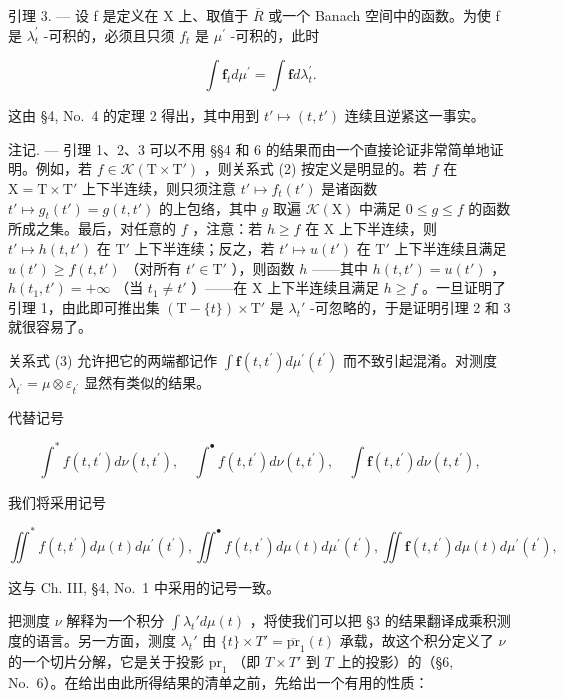 引理 3. --- 设 f 是定义在 X 上、取值于 \(\overline{R}\) 或一个 Banach 空间中的函数。为使 f 是 \(\lambda_{t}^{\prime}\) -可积的，必须且只须 \(f_{t}\) 是 \(\mu^{\prime}\) -可积的，此时

\[
\int \mathbf {f} _ {t} d \mu^ {\prime} = \int \mathbf {f} d \lambda_ {t} ^ {\prime}.\tag{3}
\]

这由 §4, No.~4 的定理 2 得出，其中用到 \(t' \mapsto (t, t')\) 连续且逆紧这一事实。

注记. --- 引理 1、2、3 可以不用 §§4 和 6 的结果而由一个直接论证非常简单地证明。例如，若 \(f \in \mathcal{K}(\mathrm{T} \times \mathrm{T}')\) ，则关系式 (2) 按定义是明显的。若 \(f\) 在 \(\mathrm{X} = \mathrm{T} \times \mathrm{T}'\) 上下半连续，则只须注意 \(t' \mapsto f_t(t')\) 是诸函数 \(t' \mapsto g_t(t') = g(t, t')\) 的上包络，其中 \(g\) 取遍 \(\mathcal{K}(\mathrm{X})\) 中满足 \(0 \leqslant g \leqslant f\) 的函数所成之集。最后，对任意的 \(f\) ，注意：若 \(h \geqslant f\) 在 \(\mathrm{X}\) 上下半连续，则 \(t' \mapsto h(t, t')\) 在 \(\mathrm{T}'\) 上下半连续；反之，若 \(t' \mapsto u(t')\) 在 \(\mathrm{T}'\) 上下半连续且满足 \(u(t') \geqslant f(t, t')\) （对所有 \(t' \in \mathrm{T}'\) ），则函数 \(h\) ——其中 \(h(t, t') = u(t')\) ，\(h(t_1, t') = +\infty\) （当 \(t_1 \neq t'\) ）——在 \(\mathrm{X}\) 上下半连续且满足 \(h \geqslant f\) 。一旦证明了引理 1，由此即可推出集 \((\mathrm{T} - \{t\}) \times \mathrm{T}'\) 是 \(\lambda_t'\) -可忽略的，于是证明引理 2 和 3 就很容易了。

关系式 (3) 允许把它的两端都记作 \(\int\mathbf{f}(t,t^{\prime})d\mu^{\prime}(t^{\prime})\) 而不致引起混淆。对测度 \(\lambda_{t^{\prime}}=\mu\otimes\varepsilon_{t^{\prime}}\) 显然有类似的结果。

代替记号

\[
\int^ {*} f (t, t ^ {\prime}) d \nu (t, t ^ {\prime}), \quad \int^ {\bullet} f (t, t ^ {\prime}) d \nu (t, t ^ {\prime}), \quad \int \mathbf {f} (t, t ^ {\prime}) d \nu (t, t ^ {\prime}),
\]

我们将采用记号

\[
\iint^ {*} f (t, t ^ {\prime}) d \mu (t) d \mu^ {\prime} (t ^ {\prime}), \iint^ {\bullet} f (t, t ^ {\prime}) d \mu (t) d \mu^ {\prime} (t ^ {\prime}), \iint \mathbf {f} (t, t ^ {\prime}) d \mu (t) d \mu^ {\prime} (t ^ {\prime}),
\]

这与 Ch. III, §4, No.~1 中采用的记号一致。

把测度 \(\nu\) 解释为一个积分 \(\int \lambda_t' d\mu(t)\) ，将使我们可以把 §3 的结果翻译成乘积测度的语言。另一方面，测度 \(\lambda_t'\) 由 \(\{t\} \times T' = \overline{\text{pr}}_1(t)\) 承载，故这个积分定义了 \(\nu\) 的一个切片分解，它是关于投影 \(\text{pr}_1\) （即 \(T \times T'\) 到 \(T\) 上的投影）的（§6, No.~6）。在给出由此所得结果的清单之前，先给出一个有用的性质：

